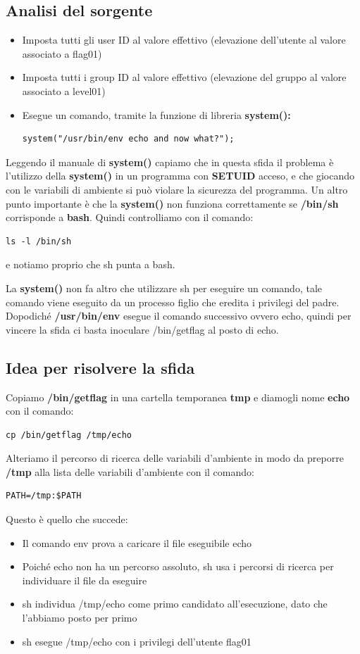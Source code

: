 \subsection{Analisi del sorgente}
\begin{itemize}
    \item Imposta tutti gli user ID al valore effettivo (elevazione dell’utente al valore associato a flag01) 
    \item Imposta tutti i group ID al valore effettivo (elevazione del gruppo al valore associato a level01) 
    \item Esegue un comando, tramite la funzione di libreria \textbf{system():} \begin{lstlisting}[style=cstyle]
        system("/usr/bin/env echo and now what?");
    \end{lstlisting}
\end{itemize}
Leggendo il manuale di \textbf{system()} capiamo che in questa sfida il problema è l’utilizzo della \textbf{system()} in un programma con \textbf{SETUID} acceso, e che giocando con le variabili di ambiente si può violare la sicurezza del programma.
Un altro punto importante è che la \textbf{system()} non funziona correttamente se \textbf{/bin/sh} corrisponde a \textbf{bash}. Quindi controlliamo con il comando: 
\begin{lstlisting}[style=bashstyle]
    ls -l /bin/sh
\end{lstlisting} 
e notiamo proprio che sh punta a bash.

La \textbf{system()} non fa altro che utilizzare sh per eseguire un comando, tale comando viene eseguito da un processo figlio che eredita i privilegi del padre.
Dopodiché \textbf{/usr/bin/env} esegue il comando successivo ovvero echo, quindi per vincere la sfida ci basta inoculare /bin/getflag al posto di echo.

\subsection{Idea per risolvere la sfida}
Copiamo \textbf{/bin/getflag} in una cartella temporanea \textbf{tmp} e diamogli nome \textbf{echo} con il comando: \begin{lstlisting}[style=bashstyle]
    cp /bin/getflag /tmp/echo
\end{lstlisting}
Alteriamo il percorso di ricerca delle variabili d'ambiente in modo da preporre \textbf{/tmp} alla lista delle variabili d'ambiente con il comando: 
\begin{lstlisting}[style=bashstyle]
    PATH=/tmp:$PATH
\end{lstlisting}
Questo è quello che succede:
\begin{itemize}
    \item Il comando env prova a caricare il file eseguibile echo
    \item Poiché echo non ha un percorso assoluto, sh usa i percorsi di ricerca per individuare il file da eseguire 
    \item sh individua /tmp/echo come primo candidato all’esecuzione, dato che l'abbiamo posto per primo
    \item sh esegue /tmp/echo con i privilegi dell’utente flag01
\end{itemize}

